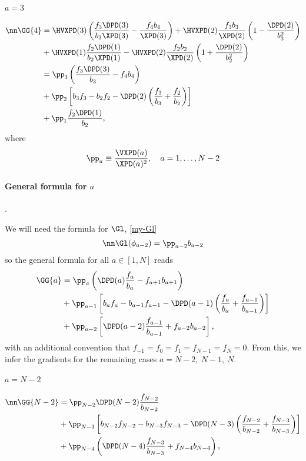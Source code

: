 \paragraph{$a=3$}
  \begin{align}
    \nn\GG{4}&=
    \HVXPD(3)\left(\frac{f_3\DPD(3)}{b_3\XPD(3)}-\frac{f_4b_4}{\XPD(3)}\right)
    +\HVXPD(2)\frac{f_3b_3}{\XPD(2)}\left(1-\frac{\DPD(2)}{b_3^2}\right)\\
    &+\HVXPD(1)\frac{f_2\DPD(1)}{b_2\XPD(1)}
    -\HVXPD(2)\frac{f_2b_{2}}{\XPD(2)}\left(1+\frac{\DPD(2)}{b_2^2}\right)\\
    &= \pp_3
    \left(\frac{f_3\DPD(3)}{b_3}-f_4b_4\right)\\
    &+\pp_2\left[b_3f_3-b_2f_2-
    \DPD(2)\left(\frac{f_3}{b_3}+\frac{f_2}{b_2}\right)\right]\\
    &+\pp_1\frac{f_2\DPD(1)}{b_2},
  \end{align}
  where
  \begin{equation}
    \pp_a\equiv\frac{\VXPD(a)}{\XPD(a)^2},\quad a=1,\ldots,N-2
  \end{equation}

\paragraph{General formula for $a$}. 

We will need the formula for $\Gl$, \eqref{my-Gl}
  \begin{align}
    \nn\Gl(\phi_{a-2})=\pp_{a-2}b_{a-2}
\end{align}
so the general formula for all $a\in[1,N]$ reads
\begin{align}
  \GG{a}&=
  \pp_a
    \left(\DPD(a)\frac{f_a}{b_a}-f_{a+1}b_{a+1}\right)\\
    &+\pp_{a-1}\left[b_{a}f_a-b_{a-1}f_{a-1}-
    \DPD(a-1)\left(\frac{f_a}{b_a}+\frac{f_{a-1}}{b_{a-1}}\right)\right]\\
    &+\pp_{a-2}\left[\DPD(a-2)\frac{f_{a-1}}{b_{a-1}}+f_{a-2}b_{a-2}\right],
\end{align}
with an additional convention that $f_{-1}=f_0=f_1=f_{N-1}=f_N=0$.
From this, we infer the gradients for the remaining cases $a=N-2,\ N-1,\ N$.

\paragraph{$a=N-2$}

  \begin{align}
    \nn\GG{N-2}&=
    \pp_{N-2}
    \DPD(N-2)\frac{f_{N-2}}{b_{N-2}}\\
    &+\pp_{N-3}\left[b_{N-2}f_{N-2}-b_{N-3}f_{N-3}-
    \DPD(N-3)\left(\frac{f_{N-2}}{b_{N-2}}+\frac{f_{N-3}}{b_{N-3}}\right)\right]\\
    &+\pp_{N-4}\left(\DPD(N-4)\frac{f_{N-3}}{b_{N-3}}+f_{N-4}b_{N-4}\right),
  \end{align}

